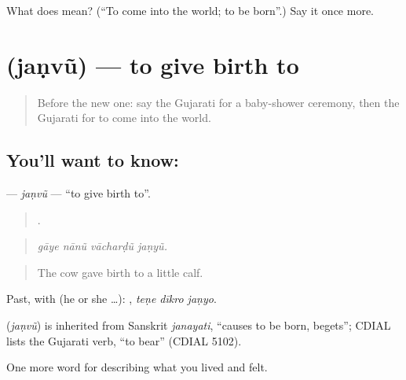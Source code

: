 \begin{tcolorbox}[breakable,colback=teal!4,colframe=teal!35!black,title={Before you move on}]
What does  mean? (\textquotedblleft{}To come into the world; to be born\textquotedblright{}.) Say it once more.
\end{tcolorbox}
\section[\texorpdfstring{\gu{જણવું} (jaṇvũ)}{જણવું (jaṇvũ)}]{ (jaṇvũ) — to give birth to}

\label{lesson:GU-C495-janvu}



\begin{quote}
Before the new one: say the Gujarati for a baby-shower ceremony, then the Gujarati for to come into the world.
\end{quote}

\subsection*{You'll want to know: }
\textbf{} — \emph{jaṇvũ} — \textquotedblleft{}to give birth to\textquotedblright{}.

\begin{quote}
   .
\end{quote}

\begin{quote}
\emph{gāye nānũ vācharḍũ jaṇyũ.}
\end{quote}

\begin{quote}
The cow gave birth to a little calf.
\end{quote}

Past, with  (he or she …):   , \emph{teṇe dīkro jaṇyo}.

\begin{cousinweb}
\textbf{} (\emph{jaṇvũ}) is inherited from Sanskrit \emph{janayati}, \textquotedblleft{}causes to be born, begets\textquotedblright{}; CDIAL lists the Gujarati verb, \textquotedblleft{}to bear\textquotedblright{} (CDIAL 5102).
\end{cousinweb}

\begin{grammarlens}[title={What you've built}]
One more word for describing what you lived and felt.
\end{grammarlens}

